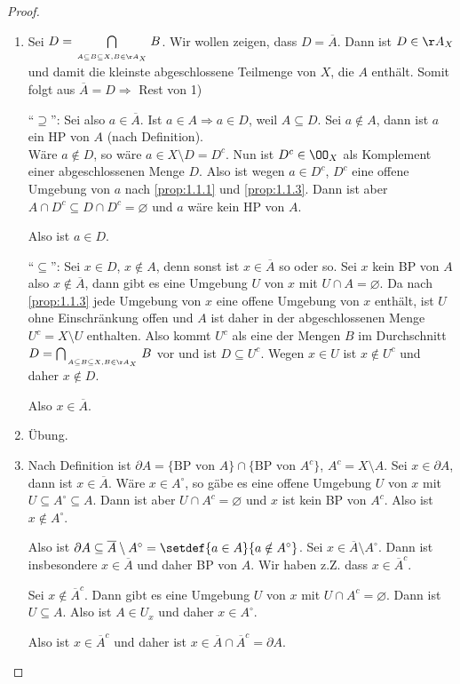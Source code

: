 \begin{proof}
\begin{enumerate}
  \item Sei $D= \bigcap\limits_{\atop{A\subseteq B\subseteq X,}{B\in\AA_X}} B$.
  Wir wollen zeigen, dass $D=\overline{A}$. Dann ist $D\in\AA_X$ und damit die
  kleinste abgeschlossene Teilmenge von $X$, die $A$ enthält. Somit folgt aus
  $\overline{A} = D \Rightarrow $ Rest von 1) 
  
``$\supseteq$'': Sei also $a\in\overline{A}$. Ist $a\in A\Rightarrow a\in D$,
  weil $A\subseteq D$. Sei $a\notin A$, dann ist $a$ ein HP von $A$ (nach
  Definition).\\
  Wäre $a\notin D$, so wäre $a\in X\setminus D = D^c$. Nun ist $D^c\in \OO_X$ als
  Komplement einer abgeschlossenen Menge $D$. Also ist wegen $a\in D^c$, $D^c$
  eine offene Umgebung von $a$ nach \ref{prop:1.1.1} und \ref{prop:1.1.3}. Dann
  ist aber $A\cap D^c\subseteq D\cap D^c = \varnothing$ und $a$ wäre kein HP von
  $A$.\dipper
  
  Also ist $a\in D$.
  
  ``$\subseteq$'': Sei $x\in D$, $x\notin A$, denn sonst ist $x\in\overline{A}$
  so oder so. Sei $x$ kein BP von $A$ also $x\notin \overline{A}$, dann gibt es
  eine Umgebung $U$ von $x$ mit $U\cap A = \varnothing$. Da nach
  \ref{prop:1.1.3} jede Umgebung von $x$ eine offene Umgebung von $x$ enthält,
  ist $U$ ohne Einschränkung offen und $A$ ist daher in der abgeschlossenen
  Menge $U^c = X\setminus U$ enthalten. Also kommt $U^c$ als eine der Mengen $B$
  im Durchschnitt $D=\bigcap_{\atop{A\subseteq B\subseteq X,}{B\in\AA_X}} B$
  vor und ist $D\subseteq U^c$. Wegen $x\in U$ ist $x\notin U^c$ und daher
  $x\notin D$.\dipper
  
  Also $x\in \overline{A}$.
  \item Übung.
  \item Nach Definition ist $\partial A = \{\text{BP von }A\}\cap \{\text{BP
  von }A^c\}$, $A^c = X\setminus A$.
  Sei $x\in \partial A$, dann ist $x\in\overline{A}$. Wäre $x\in A^\circ$, so
  gäbe es eine offene Umgebung $U$ von $x$ mit $U\subseteq A^\circ\subseteq A$.
  Dann ist aber $U\cap A^c=\varnothing$ und $x$ ist kein BP von $A^c$. Also ist
  $x\notin A^\circ$.
  
  Also ist $\partial A \subseteq \overline{A}\setminus A^\circ = \setdef{a\in
  A}{a\notin A^\circ}$. Sei $x\in \overline{A}\setminus A^\circ$. Dann ist
  insbesondere $x\in \overline{A}$ und daher BP von $A$. Wir haben z.Z. dass
  $x\in\overline{A}^c$.
  
  Sei $x\notin \overline{A}^c$. Dann gibt es eine Umgebung $U$ von $x$ mit
  $U\cap A^c =\varnothing$. Dann ist $U\subseteq A$. Also ist $A\in U_x$ und
  daher $x\in A^\circ$.\dipper
  
  Also ist $x\in\overline{A}^c$ und daher ist $x\in \overline{A}\cap
  \overline{A}^c = \partial A$.\qedhere
\end{enumerate}
\end{proof}

